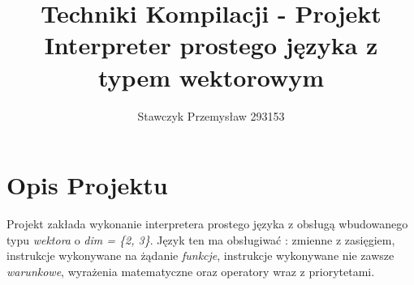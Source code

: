 \documentclass[11pt]{article} %
\title{%
	Techniki Kompilacji - Projekt \\
	\large Interpreter prostego języka z typem wektorowym
	}
\author{Stawczyk Przemysław 293153}
\date{} %
\begin{document}
\maketitle



\section{Opis Projektu}
Projekt zakłada wykonanie interpretera prostego języka z obsługą wbudowanego typu \textsl{wektora} o \textsl{dim = \{2, 3\}}. Język ten ma obsługiwać : zmienne z zasięgiem, instrukcje wykonywane na żądanie \textsl{funkcje}, instrukcje wykonywane nie zawsze \textsl{warunkowe}, wyrażenia matematyczne oraz operatory wraz z priorytetami.
\end{document}
